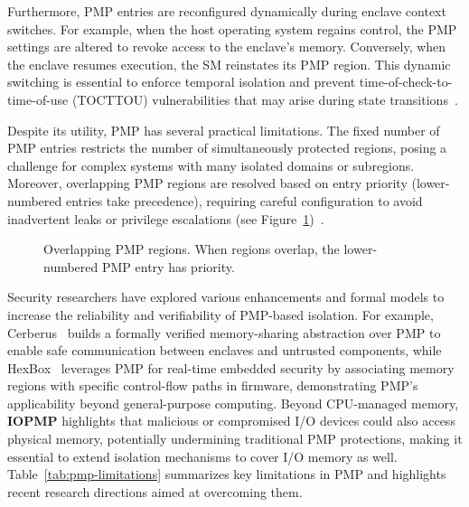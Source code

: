 Furthermore, PMP entries are reconfigured dynamically during enclave context switches. For example, when the host operating system regains control, the PMP settings are altered to revoke access to the enclave’s memory. Conversely, when the enclave resumes execution, the SM reinstates its PMP region. This dynamic switching is essential to enforce temporal isolation and prevent time-of-check-to-time-of-use (TOCTTOU) vulnerabilities that may arise during state transitions~\cite{lee2022cerberus}.

Despite its utility, PMP has several practical limitations. The fixed number of PMP entries restricts the number of simultaneously protected regions, posing a challenge for complex systems with many isolated domains or subregions. Moreover, overlapping PMP regions are resolved based on entry priority (lower-numbered entries take precedence), requiring careful configuration to avoid inadvertent leaks or privilege escalations (see Figure~\ref{fig:pmp-priority})~\cite{riscvprivspec}.

\begin{figure}[htbp]
\centering
{}
\caption{Overlapping PMP regions. When regions overlap, the lower-numbered PMP entry has priority.}
\label{fig:pmp-priority}
\end{figure}


Security researchers have explored various enhancements and formal models to increase the reliability and verifiability of PMP-based isolation. For example, Cerberus~\cite{lee2022cerberus} builds a formally verified memory-sharing abstraction over PMP to enable safe communication between enclaves and untrusted components, while HexBox~\cite{hexbox2018} leverages PMP for real-time embedded security by associating memory regions with specific control-flow paths in firmware, demonstrating PMP's applicability beyond general-purpose computing. Beyond CPU-managed memory, \textbf{IOPMP} highlights that malicious or compromised I/O devices could also access physical memory, potentially undermining traditional PMP protections, making it essential to extend isolation mechanisms to cover I/O memory as well.
Table~\ref{tab:pmp-limitations} summarizes key limitations in PMP and highlights recent research directions aimed at overcoming them.

